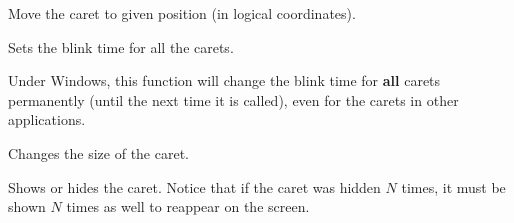 
Move the caret to given position (in logical coordinates).

\label{wxcaretsetblinktime}


Sets the blink time for all the carets.


Under Windows, this function will change the blink time for {\bf all} carets
permanently (until the next time it is called), even for the carets in other
applications.



\label{wxcaretsetsize}



Changes the size of the caret.

\label{wxcaretshow}


Shows or hides the caret. Notice that if the caret was hidden $N$ times, it
must be shown $N$ times as well to reappear on the screen.

